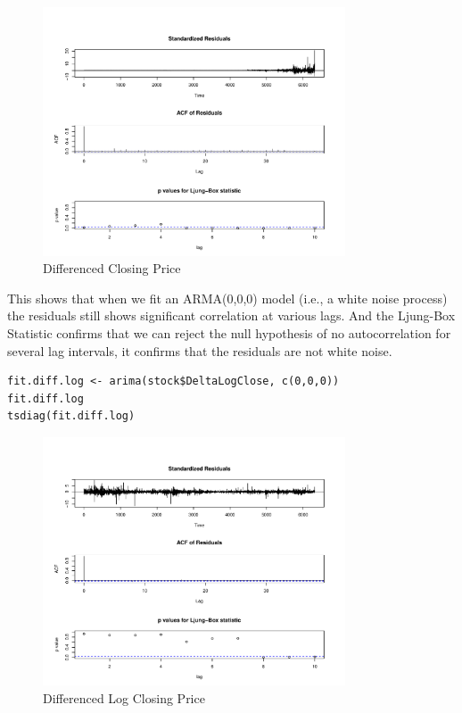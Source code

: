 \begin{figure}[H]
\centering
\includegraphics[width=0.8\textwidth]{plots/NVD3.pdf}
\caption{Differenced Closing Price}
\end{figure}

This shows that when we fit an ARMA(0,0,0) model (i.e., a white noise process) the residuals still shows significant correlation at various lags. And the Ljung-Box Statistic confirms that we can reject the null hypothesis of no autocorrelation for several lag intervals, it confirms that the residuals are not white noise. 

\begin{lstlisting}
fit.diff.log <- arima(stock$DeltaLogClose, c(0,0,0))
fit.diff.log
tsdiag(fit.diff.log)
\end{lstlisting}

\begin{figure}[H]
\centering
\includegraphics[width=0.8\textwidth]{plots/NVD4.pdf}
\caption{Differenced Log Closing Price }
\end{figure}

